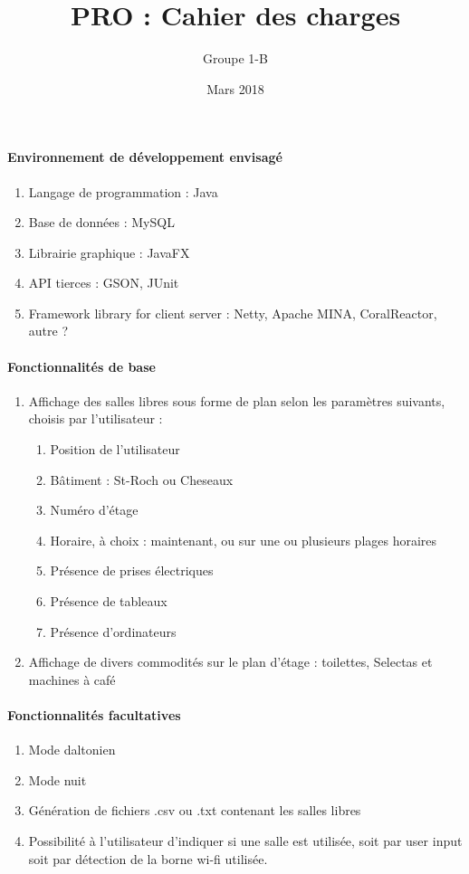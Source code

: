 \documentclass[a4paper]{article}
\title{PRO : Cahier des charges}
\author{Groupe 1-B}
\date{Mars 2018}
\begin{document}
\maketitle

\paragraph{Environnement de développement envisagé}
\begin{enumerate}
\item Langage de programmation : Java
\item Base de données : MySQL
\item Librairie graphique : JavaFX
\item API tierces : GSON, JUnit
\item Framework library for client server : Netty, Apache MINA, CoralReactor, autre ?
\end{enumerate}

\paragraph{Fonctionnalités de base}
\begin{enumerate}
\item Affichage des salles libres sous forme de plan selon les paramètres suivants, choisis par l'utilisateur :
	\begin{enumerate}
	\item Position de l'utilisateur
	\item Bâtiment : St-Roch ou Cheseaux
	\item Numéro d'étage
	\item Horaire, à choix : maintenant, ou sur une ou plusieurs plages horaires
	\item Présence de prises électriques
	\item Présence de tableaux
	\item Présence d'ordinateurs
    \end{enumerate}
\item Affichage de divers commodités sur le plan d'étage : toilettes, Selectas et machines à café
\end{enumerate} 

\paragraph{Fonctionnalités facultatives}
\begin{enumerate}
\item Mode daltonien
\item Mode nuit
\item Génération de fichiers .csv ou .txt contenant les salles libres
\item Possibilité à l'utilisateur d'indiquer si une salle est utilisée, soit par user input soit par détection de la borne wi-fi utilisée.
\end{enumerate} 
\end{document}
